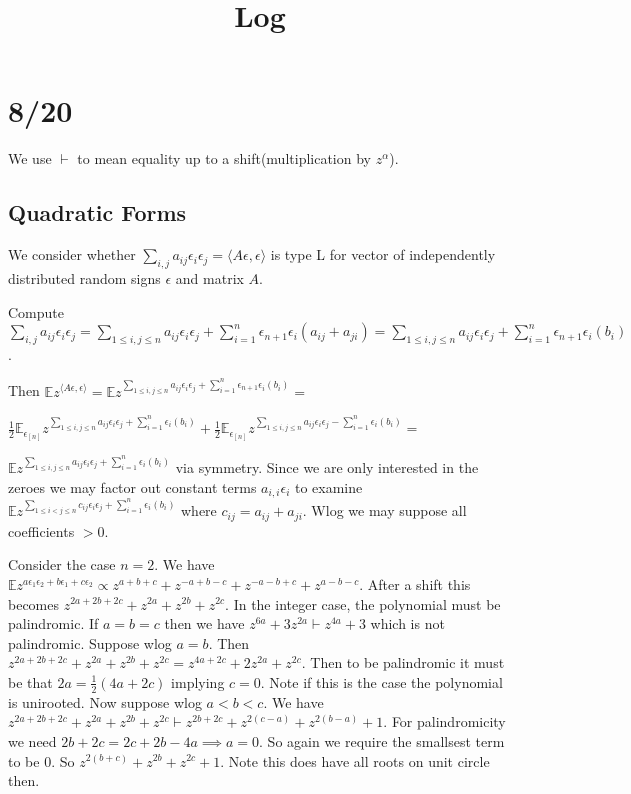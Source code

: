 \documentclass[10pt]{article}
\title{\vspace{-3em}Log}
\newcommand{\E}{\mathbb{E}}
\newcommand{\1}{\textbf{1}}
\newcommand{\shift}{\vdash}
\theoremstyle{remark}
\theoremstyle{definition}
\begin{document}
\section{8/20}

We use $\vdash$ to mean equality up to a shift(multiplication by $z^{\alpha}$).

\subsection{Quadratic Forms}

We consider whether $\sum_{i,j} a_{ij} \epsilon_i \epsilon_j = \langle A \epsilon,\epsilon\rangle$ is type L for vector of independently distributed random signs $\epsilon$ and matrix $A$. 

Compute $\sum_{i,j} a_{ij} \epsilon_i \epsilon_j = \sum_{1 \leq i,j\leq n} a_{ij} \epsilon_i \epsilon_j + \sum_{i=1}^n \epsilon_{n+1}\epsilon_i(a_{ij}+a_{ji}) = \sum_{1 \leq i,j\leq n} a_{ij} \epsilon_i \epsilon_j+ \sum_{i=1}^n \epsilon_{n+1}\epsilon_i(b_i)$. 

Then $\E z^{\langle A\epsilon, \epsilon \rangle} = \E z^{\sum_{1 \leq i,j\leq n} a_{ij} \epsilon_i \epsilon_j+ \sum_{i=1}^n \epsilon_{n+1}\epsilon_i(b_i)} =$ 

$\frac{1}{2}\E_{\epsilon_{[n]}}z^{\sum_{1 \leq i,j\leq n} a_{ij} \epsilon_i \epsilon_j+ \sum_{i=1}^n \epsilon_i(b_i)}+\frac{1}{2}\E_{\epsilon_{[n]}}z^{\sum_{1 \leq i,j\leq n} a_{ij} \epsilon_i \epsilon_j- \sum_{i=1}^n \epsilon_i(b_i)}=$

$\E z^{\sum_{1 \leq i,j\leq n} a_{ij} \epsilon_i \epsilon_j+ \sum_{i=1}^n \epsilon_i(b_i)}$ via symmetry. Since we are only interested in the zeroes we may factor out constant terms $a_{i,i}\epsilon_i$ to examine $\E z^{\sum_{1 \leq i<j\leq n} c_{ij} \epsilon_i \epsilon_j+ \sum_{i=1}^n \epsilon_i(b_i)}$ where $c_{ij} = a_{ij}+a_{ji}$. Wlog we may suppose all coefficients $> 0$.

Consider the case $n = 2$. We have $\E z^{a\epsilon_1 \epsilon_2 + b\epsilon_1 + c \epsilon_2} \propto z^{a+b+c} + z^{-a+b-c}+z^{-a-b+c}+z^{a-b-c}$. After a shift this becomes $z^{2a+2b+2c}+z^{2a}+z^{2b}+z^{2c}$. In the integer case, the polynomial must be palindromic. If $a=b=c$ then we have $z^{6a} +3z^{2a} \vdash z^{4a} +3$ which is not palindromic. Suppose wlog $a=b$. Then $z^{2a+2b+2c}+z^{2a}+z^{2b}+z^{2c} = z^{4a+2c}+2z^{2a}+z^{2c}$. Then to be palindromic it must be that $2a = \frac{1}{2}(4a+2c)$ implying $c = 0$. Note if this is the case the polynomial is unirooted. Now suppose wlog  $a<b<c$. We have $z^{2a+2b+2c}+z^{2a}+z^{2b}+z^{2c} \shift z^{2b+2c}+z^{2(c-a)}+z^{2(b-a)}+1$. For palindromicity we need $2b+2c = 2c+2b-4a \implies a = 0$. So again we require the smallsest term to be 0. So $z^{2(b+c)}+z^{2b}+z^{2c}+1$. Note this does have all roots on unit circle then.
\end{document}
